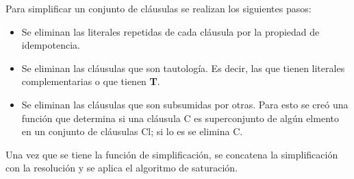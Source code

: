 \documentclass{article}
\begin{document}
Para simplificar un conjunto de cláusulas se realizan los siguientes pasos:

\begin{itemize}
\item Se eliminan las literales repetidas de cada cláusula por la propiedad de idempotencia.
\item Se eliminan las cláusulas que son tautología. Es decir, las que tienen literales complementarias o que tienen \textbf{T}.
\item Se eliminan las cláusulas que son subsumidas por otras. Para esto se creó una función que determina si una cláusula C es superconjunto de algún elmento en un conjunto de cláusulas Cl; si lo es se elimina C.
\end{itemize}

Una vez que se tiene la función de simplificación, se concatena la simplificación con la resolución y se aplica el algoritmo de saturación.
\end{document}

